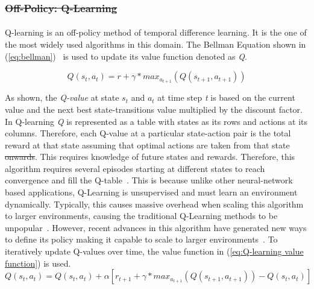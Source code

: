 \documentclass[12pt,american]{report}
\providecommand{\DIFaddtex}[1]{{\protect\color{blue}\uwave{#1}}} %
\providecommand{\DIFdeltex}[1]{{\protect\color{red}\sout{#1}}}                      %
\providecommand{\DIFaddbegin}{} %
\providecommand{\DIFaddend}{} %
\providecommand{\DIFdelbegin}{} %
\providecommand{\DIFdelend}{} %
\providecommand{\DIFadd}[1]{\texorpdfstring{\DIFaddtex{#1}}{#1}} %
\providecommand{\DIFdel}[1]{\texorpdfstring{\DIFdeltex{#1}}{}} %
\newcommand{\DIFscaledelfig}{0.5}
\newlength{\DIFdelgraphicswidth} %
\newlength{\DIFdelgraphicsheight} %
\newcommand{\DIFaddincludegraphics}[2][]{{\color{blue}\fbox{\DIFOincludegraphics[#1]{#2}}}} %
\newcommand{\DIFdelincludegraphics}[2][]{%
\sbox{\DIFdelgraphicsbox}{\DIFOincludegraphics[#1]{#2}}%
\settoboxwidth{\DIFdelgraphicswidth}{\DIFdelgraphicsbox} %
\settoboxtotalheight{\DIFdelgraphicsheight}{\DIFdelgraphicsbox} %
\scalebox{\DIFscaledelfig}{%
\parbox[b]{\DIFdelgraphicswidth}{\usebox{\DIFdelgraphicsbox}\\[-\baselineskip] \rule{\DIFdelgraphicswidth}{0em}}\llap{\resizebox{\DIFdelgraphicswidth}{\DIFdelgraphicsheight}{%
\setlength{\unitlength}{\DIFdelgraphicswidth}%
\begin{picture}(1,1)%
\thicklines\linethickness{2pt} %
{\color[rgb]{1,0,0}\put(0,0){\framebox(1,1){}}}%
{\color[rgb]{1,0,0}\put(0,0){\line( 1,1){1}}}%
{\color[rgb]{1,0,0}\put(0,1){\line(1,-1){1}}}%
\end{picture}%
}\hspace*{3pt}}} %
} %
\DeclareRobustCommand{\DIFaddbegin}{\DIFOaddbegin \let\includegraphics\DIFaddincludegraphics} %
\DeclareRobustCommand{\DIFaddend}{\DIFOaddend \let\includegraphics\DIFOincludegraphics} %
\DeclareRobustCommand{\DIFdelbegin}{\DIFOdelbegin \let\includegraphics\DIFdelincludegraphics} %
\DeclareRobustCommand{\DIFdelend}{\DIFOaddend \let\includegraphics\DIFOincludegraphics} %
\begin{document}
        
        \DIFdelbegin \subsubsection{\DIFdel{Off-Policy: Q-Learning}}
\addtocounter{subsubsection}{-1}%
\DIFdelend \DIFaddbegin \paragraph{\DIFadd{Off-Policy: Q-Learning}}
        \DIFaddend Q-learning is an off-policy method of temporal difference learning. It is the one of the most widely used algorithms in this domain. The Bellman Equation shown in (\ref{eq:bellman})~\cite{matiisen_2015} is used to update its value function denoted as \textit{Q}.

        \begin{equation}
            \label{eq:bellman}
            Q(s_{t},a_{t}) = r + \gamma*max_{a_{t+1} }(Q(s_{t+1},a_{t+1}))
        \end{equation}

        As shown, the \textit{Q-value} at state \textit{$s_t$} and \textit{$a_t$} at time step \textit{t} is based on the current value and the next best state-transitions value multiplied by the discount factor. In Q-learning \textit{Q} is represented as a table with states as its rows and actions at its columns.  Therefore, each Q-value at a particular state-action pair is the total reward at that state assuming that optimal actions are taken from that state \DIFdelbegin \DIFdel{onwards}\DIFdelend \DIFaddbegin \DIFadd{onward}\DIFaddend .  This requires knowledge of future states and rewards.  Therefore, this algorithm requires several episodes starting at different states to reach convergence and fill the Q-table~\cite{Watkins:1992}. This is because unlike other neural-network based applications, Q-Learning is unsupervised and must learn an environment dynamically. Typically, this causes massive overhead when scaling this algorithm to larger environments, causing the traditional Q-Learning methods to be unpopular~\cite{peng2015mobile}.  However, recent advances in this algorithm have generated new ways to define its policy making it capable to scale to larger environments~\cite{Greedy}. To iteratively update Q-values over time, the value function in (\ref{eq:Q-learning value function}) is used. 
        \begin{equation}
            \label{eq:Q-learning value function}
            Q(s_{t},a_{t}) = Q(s_{t},a_{t}) + \alpha[r_{t+1} + \gamma*max_{a_{t+1} }(Q(s_{t+1},a_{t+1}))-Q(s_{t},a_{t})]
        \end{equation}
\end{document}
